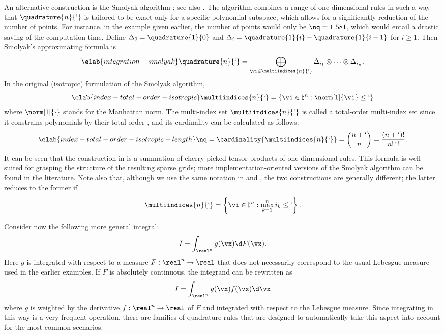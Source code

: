 An alternative construction is the Smolyak algorithm \cite{smolyak1963}; see
also \cite{eldred2008, heiss2008, maitre2010}. The algorithm combines a range of
one-dimensional rules in such a way that $\quadrature{n}{\lq}$ is tailored to be
exact only for a specific polynomial subspace, which allows for a significantly
reduction of the number of points. For instance, in the example given earlier,
the number of points would only be $\nq = 1~581$, which would entail a drastic
saving of the computation time. Define $\Delta_0 = \quadrature{1}{0}$ and
$\Delta_i = \quadrature{1}{i} - \quadrature{1}{i - 1}$ for $i \geq 1$. Then
Smolyak's approximating formula is
\begin{equation} \elab{integration-smolyak}
  \quadrature{n}{\lq} = \bigoplus_{\vi \in \multiindices{n}{\lq}} \Delta_{i_1} \otimes \cdots \otimes \Delta_{i_n}.
\end{equation}
In the original (isotropic) formulation of the Smolyak algorithm,
\begin{equation} \elab{index-total-order-isotropic}
  \multiindices{n}{\lq} = \left\{ \vi \in \natural^n: \norm[1]{\vi} \leq \lq \right\}
\end{equation}
where $\norm[1]{\cdot}$ stands for the Manhattan norm. The multi-index set
$\multiindices{n}{\lq}$ is called a total-order multi-index set since it
constrains polynomials by their total order \cite{eldred2008, beck2011}, and its
cardinality can be calculated as follows:
\begin{equation} \elab{index-total-order-isotropic-length}
  \nq = \cardinality{\multiindices{n}{\lq}} = {n + \lq \choose n} = \frac{(n + \lq)!}{n! \, \lq!}.
\end{equation}
It can be seen that the construction in  is a
summation of cherry-picked tensor products of one-dimensional rules. This
formula is well suited for grasping the structure of the resulting sparse grids;
more implementation-oriented versions of the Smolyak algorithm can be found in
the literature. Note also that, although we use the same notation in
 and , the two constructions
are generally different; the latter reduces to the former if
\[
  \multiindices{n}{\lq} = \left\{ \vi \in \natural^n: \max_{k = 1}^n i_k \leq \lq \right\}.
\]

Consider now the following more general integral:
\[
  I = \int_{\real^n} g(\vx) \d F(\vx).
\]
Here $g$ is integrated with respect to a measure $F: \real^n \to \real$
\cite{durrett2010} that does not necessarily correspond to the usual Lebesgue
measure used in the earlier examples. If $F$ is absolutely continuous, the
integrand can be rewritten as
\[
  I = \int_{\real^n} g(\vx) f(\vx) \d \vx
\]
where $g$ is weighted by the derivative $f: \real^n \to \real$ of $F$ and
integrated with respect to the Lebesgue measure. Since integrating in this way
is a very frequent operation, there are families of quadrature rules that are
designed to automatically take this aspect into account for the most common
scenarios.

